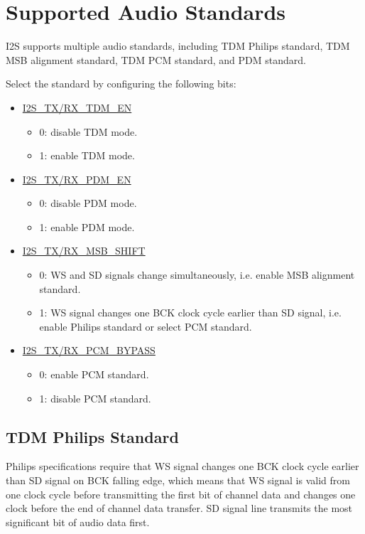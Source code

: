 \documentclass[main\_\_CN.tex]{subfiles}
\begin{document}
\section{Supported Audio Standards} \label{I2S_supported_protocal}

\chipname{} I2S supports multiple audio standards, including TDM Philips standard, TDM MSB alignment standard, TDM PCM standard, and PDM standard.

Select the standard by configuring the following bits:
\begin{itemize}
    \item \hyperref[fielddesc:I2SRXMSBSHIFT]{I2S\_TX/RX\_TDM\_EN}
    \begin{itemize}
        \item 0: disable TDM mode.
        \item 1: enable TDM mode.
    \end{itemize}
    \item \hyperref[fielddesc:I2SRXMSBSHIFT]{I2S\_TX/RX\_PDM\_EN}
    \begin{itemize}
        \item 0: disable PDM mode.
        \item 1: enable PDM mode.
    \end{itemize}
    \item \hyperref[fielddesc:I2SRXMSBSHIFT]{I2S\_TX/RX\_MSB\_SHIFT}
    \begin{itemize}
        \item 0: WS and SD signals change simultaneously, i.e. enable MSB alignment standard.
        \item 1: WS signal changes one BCK clock cycle earlier than SD signal, i.e. enable Philips standard or select PCM standard.
    \end{itemize}
    \item \hyperref[fielddesc:I2SRXPCMBYPASS]{I2S\_TX/RX\_PCM\_BYPASS}
    \begin{itemize}
        \item 0: enable PCM standard.
        \item 1: disable PCM standard.
    \end{itemize}
\end{itemize}

\subsection{TDM Philips Standard}

Philips specifications require that WS signal changes one BCK clock cycle earlier than SD signal on BCK falling edge, which means that WS signal is valid from one clock cycle before transmitting the first bit of channel data and changes one clock before the end of channel data transfer. SD signal line transmits the most significant bit of audio data first.
\end{document}
